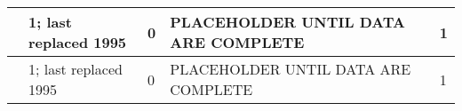 \begin{tabular}{V{.25\columnwidth}|V{.15\columnwidth}|V{.15\columnwidth}|V{.25\columnwidth}|V{.15\columnwidth}|}
        & 1; last replaced 1995                                                & 0                                                                  & PLACEHOLDER UNTIL DATA ARE COMPLETE & 1                                                            \\ \hline
{}        & 1; last replaced 1995                                                & 0                                                                  & PLACEHOLDER UNTIL DATA ARE COMPLETE & 1                                                            \\ \hline
\end{tabular}